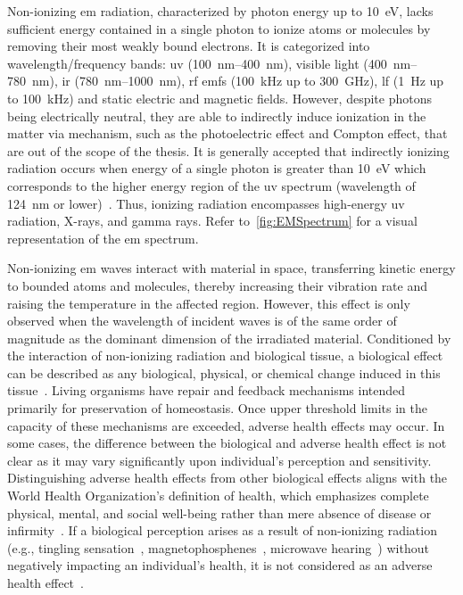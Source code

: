 Non-ionizing \gls{em} radiation, characterized by photon energy up to \SI{10}{\eV}, lacks sufficient energy contained in a single photon to ionize atoms or molecules by removing their most weakly bound electrons.
It is categorized into wavelength/frequency bands: \gls{uv} (\SIrange{100}{400}{\nm}), visible light (\SIrange{400}{780}{\nm}), \gls{ir} (\SIrange{780}{1000}{\nm}), \gls{rf} \gls{emf}s (\SI{100}{\kHz} up to \SI{300}{\GHz}), \gls{lf} (\SI{1}{\Hz} up to \SI{100}{\kHz}) and static electric and magnetic fields.
However, despite photons being electrically neutral, they are able to indirectly induce ionization in the matter via mechanism, such as the photoelectric effect and Compton effect, that are out of the scope of the thesis.
It is generally accepted that indirectly ionizing radiation occurs when energy of a single photon is greater than \SI{10}{\eV} which corresponds to the higher energy region of the \gls{uv} spectrum (wavelength of \SI{124}{\nm} or lower)~\cite{ARPANSA2023What,Bulletin1999QuestionsAA}.
Thus, ionizing radiation encompasses high-energy \gls{uv} radiation, X-rays, and gamma rays.
Refer to~\cref{fig:EMSpectrum} for a visual representation of the \gls{em} spectrum.


Non-ionizing \gls{em} waves interact with material in space, transferring kinetic energy to bounded atoms and molecules, thereby increasing their vibration rate and raising the temperature in the affected region.
However, this effect is only observed when the wavelength of incident waves is of the same order of magnitude as the dominant dimension of the irradiated material.
Conditioned by the interaction of non-ionizing radiation and biological tissue, a biological effect can be described as any biological, physical, or chemical change induced in this tissue~\cite{ICNIRP2020Principles}.
Living organisms have repair and feedback mechanisms intended primarily for preservation of homeostasis.
Once upper threshold limits in the capacity of these mechanisms are exceeded, adverse health effects may occur.
In some cases, the difference between the biological and adverse health effect is not clear as it may vary significantly upon individual's perception and sensitivity.
Distinguishing adverse health effects from other biological effects aligns with the World Health Organization's definition of health, which emphasizes complete physical, mental, and social well-being rather than mere absence of disease or infirmity~\cite{WHO2022Health}.
If a biological perception arises as a result of non-ionizing radiation (e.g., tingling sensation~\cite{Saunders2007neurobiological}, magnetophosphenes~\cite{Lövsund1980Magnetophosphenes}, microwave hearing~\cite{Frey1962Human}) without negatively impacting an individual's health, it is not considered as an adverse health effect~\cite{ICNIRP2020Principles}.


